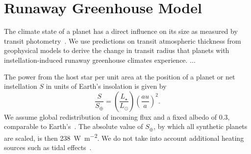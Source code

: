 \documentclass[twocolumn]{aastex631}
\begin{document}
\section{Runaway Greenhouse Model}\label{sec:met_rghmodel}
The climate state of a planet has a direct influence on its size as measured by transit photometry~\citep{Turbet2019}.
We use predictions on transit atmospheric thickness from geophysical models to derive the change in transit radius that planets with instellation-induced runaway greenhouse climates experience.
...

\begin{note}
    The power from the host star per unit area at the position of a planet or net instellation $S$ in units of Earth's insolation is given by
    \begin{equation}
        \frac{S}{S_\oplus} = \left(\frac{L_\star}{L_\odot}\right) \left(\frac{au}{a}\right)^2 .
    \end{equation}
    We assume global redistribution of incoming flux and a fixed albedo of $0.3$, comparable to Earth's~\citep{Haar1971}.
    The absolute value of $S_\oplus$, by which all synthetic planets are scaled, is then \SI{238}{\watt\per\square\meter}.
   We do not take into account additional heating sources such as tidal effects~\citep[e.g.][]{Barnes2013}.
\end{note}
\end{document}
